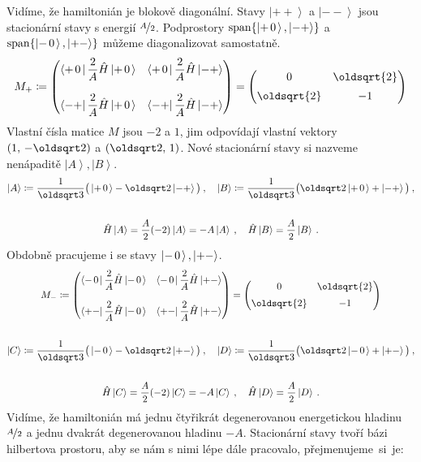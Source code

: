\documentclass[10pt,a4paper]{article}
\newcommand*{\mask}[2]{%
    \mathord{\makebox[\widthof{\(#1\)}]{\(#2\)}}%
}
\newcommand{\mat}[1]{
    \begin{pmatrix}
        #1
    \end{pmatrix}
}
\newcommand{\bra}[1]{\left< #1 \right|}
\newcommand{\ket}[1]{\left| #1 \right>}
\def\Span{\operatorname{span}}
\def\0{\mask{+}{0}}
\begin{document}
Vidíme, že hamiltonián je blokově diagonální. Stavy $\ket{++}$ a $\ket{--}$ jsou stacionární stavy s energií $\nicefrac{A}{2}$. Podprostory $\Span\{ \ket{+\0}, \ket{-+} \}$ a $\Span\{ \ket{-\0}, \ket{+-} \}$ můžeme diagonalizovat samostatně.
\begin{gather*}
    M_+ \coloneqq \mat{
        \bra{+\0} \dfrac{2}{A} \hat H \ket{+\0} &
        \bra{+\0} \dfrac{2}{A} \hat H \ket{-+} \\[15pt]
        \bra{-+} \dfrac{2}{A} \hat H \ket{+\0} &
        \bra{-+} \dfrac{2}{A} \hat H \ket{-+}
    }
    = \mat{
        0 & \oldsqrt{2} \\[5pt]
        \oldsqrt{2} & -1
    }
\end{gather*}
Vlastní čísla matice $M$ jsou $-2$ a $1$, jim odpovídají vlastní vektory $(1 ,\, -\oldsqrt 2)$ a $(\oldsqrt 2 ,\, 1)$. Nové stacionární stavy si nazveme nenápaditě $\ket{A}, \ket{B}$.
\begin{gather*}
    \ket A \coloneqq \frac{1}{\oldsqrt 3} \big(
        \ket{+\0} - \oldsqrt 2 \ket{-+}
    \big)
    \: , \quad
    \ket B \coloneqq \frac{1}{\oldsqrt 3} \big(
        \oldsqrt 2 \ket{+\0} + \ket{-+}
    \big)
    \: ,
    \\\\
    \hat H \ket A
    = \frac{A}{2} (-2) \ket A
    = -A \ket A
    \: , \quad
    \hat H \ket B
    = \frac{A}{2} \ket B
    \: .
\end{gather*}
Obdobně pracujeme i se stavy $\ket{-\0}, \ket{+-}$.
\begin{gather*}
    M_- \coloneqq \mat{
        \bra{-\0} \dfrac{2}{A} \hat H \ket{-\0} &
        \bra{-\0} \dfrac{2}{A} \hat H \ket{+-} \\[15pt]
        \bra{+-} \dfrac{2}{A} \hat H \ket{-\0} &
        \bra{+-} \dfrac{2}{A} \hat H \ket{+-}
    }
    = \mat{
        0 & \oldsqrt{2} \\[5pt]
        \oldsqrt{2} & -1
    }
    \\\\
    \ket C \coloneqq \frac{1}{\oldsqrt 3} \big(
        \ket{-\0} - \oldsqrt 2 \ket{+-}
    \big)
    \: , \quad
    \ket D \coloneqq \frac{1}{\oldsqrt 3} \big(
        \oldsqrt 2 \ket{-\0} + \ket{+-}
    \big)
    \: ,
    \\\\
    \hat H \ket C
    = \frac{A}{2} (-2) \ket C
    = -A \ket C
    \: , \quad
    \hat H \ket D
    = \frac{A}{2} \ket D
    \: .
\end{gather*}
Vidíme, že hamiltonián má jednu čtyřikrát degenerovanou energetickou hladinu $\nicefrac{A}{2}$ a jednu dvakrát degenerovanou hladinu $-A$. Stacionární stavy tvoří bázi hilbertova prostoru, aby se nám s nimi lépe dále pracovalo, přejmenujeme~si~je:
\end{document}
